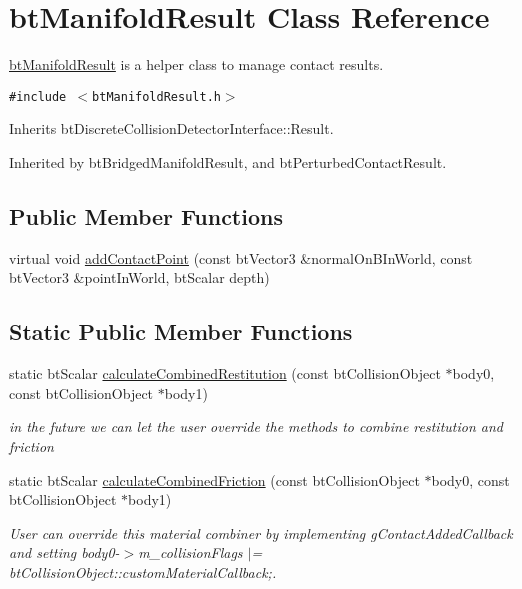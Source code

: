 \hypertarget{classbt_manifold_result}{
\section{btManifoldResult Class Reference}
\label{classbt_manifold_result}
}
\hyperlink{classbt_manifold_result}{btManifoldResult} is a helper class to manage contact results.  


{\tt \#include $<$btManifoldResult.h$>$}

Inherits btDiscreteCollisionDetectorInterface::Result.

Inherited by btBridgedManifoldResult, and btPerturbedContactResult.

\subsection*{Public Member Functions}
\begin{CompactItemize}
\item 
virtual void \hyperlink{classbt_manifold_result_ebe32f0c202d988d0458e88d768602c6}{addContactPoint} (const btVector3 \&normalOnBInWorld, const btVector3 \&pointInWorld, btScalar depth)
\end{CompactItemize}
\subsection*{Static Public Member Functions}
\begin{CompactItemize}
\item 
\hypertarget{classbt_manifold_result_a4419fc3b0d13ccc2cbfd7739b047c04}{
static btScalar \hyperlink{classbt_manifold_result_a4419fc3b0d13ccc2cbfd7739b047c04}{calculateCombinedRestitution} (const btCollisionObject $\ast$body0, const btCollisionObject $\ast$body1)}
\label{classbt_manifold_result_a4419fc3b0d13ccc2cbfd7739b047c04}

\begin{CompactList}\small\item\em in the future we can let the user override the methods to combine restitution and friction \item\end{CompactList}\item 
\hypertarget{classbt_manifold_result_162717dce3ef3a756ae55ec04a179ed5}{
static btScalar \hyperlink{classbt_manifold_result_162717dce3ef3a756ae55ec04a179ed5}{calculateCombinedFriction} (const btCollisionObject $\ast$body0, const btCollisionObject $\ast$body1)}
\label{classbt_manifold_result_162717dce3ef3a756ae55ec04a179ed5}

\begin{CompactList}\small\item\em User can override this material combiner by implementing gContactAddedCallback and setting body0-$>$m\_\-collisionFlags $|$= btCollisionObject::customMaterialCallback;. \item\end{CompactList}\end{CompactItemize}


